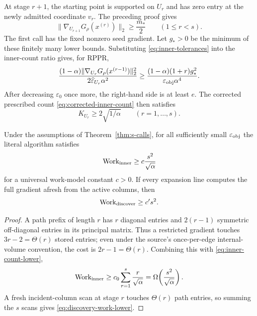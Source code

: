 \documentclass[11pt]{article}
\begin{document}
At stage $r+1$, the starting point is supported on $U_r$ and has zero entry
at the newly admitted coordinate $v_r$.  The preceding proof gives
\begin{equation}
 \|\nabla_{U_{r+1}}G_\rho(x^{(r)})\|_2
 \geq\frac{m_*}{2}
 \qquad(1\leq r<s).
 \label{eq:starting-gradient-lower}
\end{equation}
The first call has the fixed nonzero seed gradient.  Let $g_*>0$ be the
minimum of these finitely many lower bounds.  Substituting
\cref{eq:inner-tolerances} into the inner-count ratio gives, for RPPR,
\begin{equation}
 \frac{(1-\alpha)\|\nabla_{U_r}G_\rho(x^{(r-1)})\|_2^2}
      {2\widehat\varepsilon_{U_r}\alpha^2}
 \geq
 \frac{(1-\alpha)(1+r)g_*^2}
      {\varepsilon_{\rm obj}\alpha^4}.
 \label{eq:inner-ratio-lower}
\end{equation}
After decreasing $\varepsilon_0$ once more, the right-hand side is at least
$e$.  The corrected prescribed count \cref{eq:corrected-inner-count} then
satisfies
\begin{equation}
 K_{U_r}\geq 2\sqrt{1/\alpha}
 \qquad(r=1,\ldots,s).
 \label{eq:inner-count-lower}
\end{equation}

\begin{theorem}
\label{thm:aspr-path-work}
Under the assumptions of Theorem~\ref{thm:s-calls}, for all sufficiently
small $\varepsilon_{\rm obj}$ the literal \ASPR{} algorithm satisfies
\begin{equation}
 \operatorname{Work}_{\rm inner}
 \geq c\frac{s^2}{\sqrt\alpha}
 \label{eq:inner-work-lower}
\end{equation}
for a universal work-model constant $c>0$.  If every expansion line computes
the full gradient afresh from the active columns, then
\begin{equation}
 \operatorname{Work}_{\rm discover}\geq c' s^2.
 \label{eq:discovery-work-lower}
\end{equation}
\end{theorem}

\begin{proof}
A path prefix of length $r$ has $r$ diagonal entries and $2(r-1)$ symmetric
off-diagonal entries in its principal matrix.  Thus a restricted gradient
touches $3r-2=\Theta(r)$ stored entries; even under the source's once-per-edge
internal-volume convention, the cost is $2r-1=\Theta(r)$.  Combining this
with \cref{eq:inner-count-lower},
\[
 \operatorname{Work}_{\rm inner}
 \geq c_0\sum_{r=1}^s\frac{r}{\sqrt\alpha}
 =\Omega\!\left(\frac{s^2}{\sqrt\alpha}\right).
\]
A fresh incident-column scan at stage $r$ touches $\Theta(r)$ path entries,
so summing the $s$ scans gives \cref{eq:discovery-work-lower}.
\end{proof}
\end{document}
